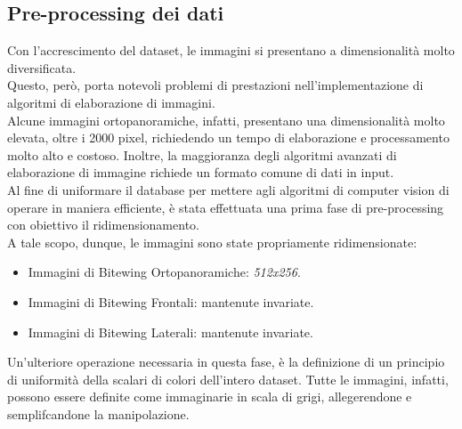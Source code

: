 \documentclass[12pt,a4paper,openright,twoside]{book}
\begin{document}
\subsection{Pre-processing dei dati}
Con l'accrescimento del dataset, le immagini si presentano a dimensionalità molto diversificata.\\
Questo, però, porta notevoli problemi di prestazioni nell'implementazione di algoritmi di elaborazione di immagini.\\
Alcune immagini ortopanoramiche, infatti, presentano una dimensionalità molto elevata, oltre i 2000 pixel, richiedendo un tempo di elaborazione e processamento molto alto e costoso. Inoltre, la maggioranza degli algoritmi avanzati di elaborazione di immagine richiede un formato comune di dati in input.\\
Al fine di uniformare il database per mettere agli algoritmi di computer vision di operare in maniera efficiente, è stata effettuata una prima fase di pre-processing con obiettivo il ridimensionamento.\\
A tale scopo, dunque, le immagini sono state propriamente ridimensionate:
\begin{itemize}
\item Immagini di Bitewing Ortopanoramiche: {\itshape 512x256}.
\item Immagini di Bitewing Frontali: mantenute invariate.
\item Immagini di Bitewing Laterali: mantenute invariate.
\end{itemize}

Un'ulteriore operazione necessaria in questa fase, è la definizione di un principio di uniformità della scalari di colori dell'intero dataset. Tutte le immagini, infatti, possono essere definite come immaginarie in scala di grigi, allegerendone e semplifcandone la manipolazione.

\end{document}
